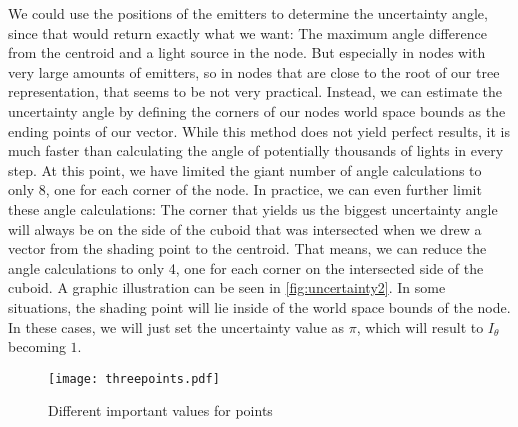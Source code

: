 We could use the positions of the emitters to determine the uncertainty angle, since that would return exactly what we want: The maximum angle difference from the centroid and a light source in the node. But especially in nodes with very large amounts of emitters, so in nodes that are close to the root of our tree representation, that seems to be not very practical. Instead, we can estimate the uncertainty angle by defining the corners of our nodes world space bounds as the ending points of our vector. While this method does not yield perfect results, it is much faster than calculating the angle of potentially thousands of lights in every step. At this point, we have limited the giant number of angle calculations to only 8, one for each corner of the node. In practice, we can even further limit these angle calculations: The corner that yields us the biggest uncertainty angle will always be on the side of the cuboid that was intersected when we drew a vector from the shading point to the centroid. That means, we can reduce the angle calculations to only 4, one for each corner on the intersected side of the cuboid. A graphic illustration can be seen in \ref{fig:uncertainty2}. In some situations, the shading point will lie inside of the world space bounds of the node. In these cases, we will just set the uncertainty value as $\pi$, which will result to $I_\theta$ becoming $1$.

\begin{figure}
	\begin{center}
		\texttt{[image: threepoints.pdf]}
		\caption{Different important values for points}
		\label{fig:threepoints}
	\end{center}
\end{figure}

